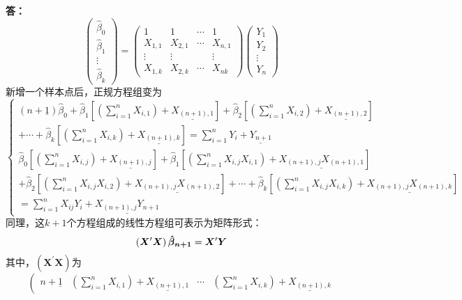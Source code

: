 \documentclass[12pt, a4paper, oneside]{article}
\newcounter{answername}
\newenvironment{answer}{\stepcounter{answername}\par\noindent\textbf{答：}\newline}{\\\par}
\begin{document}
\begin{CJK*}{UTF8}{gbsn}
\begin{answer}
$$\left(\begin{array}{c}
	\hat{\beta}_{0}
	\\
	\hat{\beta}_{1}
	\\
	\vdots
	\\
	\hat{\beta}_{k}
\end{array}\right)
=
\left(\begin{array}{cccc}
	1 & 1 & \cdots & 1
	\\
	X_{1, 1} & X_{2, 1} & \cdots & X_{n, 1}
	\\
	\vdots & \vdots & & \vdots
	\\
	X_{1, k} & X_{2, k} & \cdots & X_{n k}
\end{array}\right)
\left(\begin{array}{c}
	Y_{1}\\ Y_{2} \\ \vdots \\ Y_{n}
\end{array}\right)
$$
新增一个样本点后，正规方程组变为
$$
	\left\{\begin{array}{l}
	 (n+\underline{1})\hat{\beta}_{0}
	+\hat{\beta}_{1} \left[ (\sum_{i=1}^n{X_{i, 1}}) + \underline{X_{(n+1), 1}} \right]
	+\hat{\beta}_{2} \left[ (\sum_{i=1}^n{X_{i, 2}}) + \underline{X_{(n+1), 2}} \right]
	\\+\cdots
	+\hat{\beta}_{k} \left[ (\sum_{i=1}^n{X_{i, k}}) + \underline{X_{(n+1), k}} \right]
	=\sum_{i=1}^n{Y_{i}}
	+\underline{Y_{n+1}}
	\\
	 \hat{\beta}_{0} \left[ (\sum_{i=1}^n{X_{i, j}}) + \underline{X_{(n+1), j}} \right]
	+\hat{\beta}_{1} \left[ (\sum_{i=1}^n{X_{i, j} X_{i, 1}}) + \underline{X_{(n+1), j} X_{(n+1), 1}} \right]
	\\+\hat{\beta}_{2} \left[ (\sum_{i=1}^n{X_{i, j} X_{i, 2}}) + \underline{X_{(n+1), j} X_{(n+1), 2}} \right]
	+\cdots
	+\hat{\beta}_{k} \left[ (\sum_{i=1}^n{X_{i, j} X_{i, k}}) + \underline{X_{(n+1), j} X_{(n+1), k}}  \right]
	\\=\sum_{i=1}^n{X_{ij}Y_{i}} + \underline{X_{(n+1),j} Y_{n+1}}
	\end{array}\right.
$$
同理，这$k+1$个方程组成的线性方程组可表示为矩阵形式：
	\vspace{-0.5cm}
	$$
	\vspace{-0.5cm}
	\left(\boldsymbol{X}^{\prime} \boldsymbol{X}\right) \boldsymbol{\hat{\beta}_{n+1}}=\boldsymbol{X}^{\prime} \boldsymbol{Y}
	$$
其中，$\left(\boldsymbol{X}^{\prime} \boldsymbol{X}\right)$为
$$
\left(\begin{array}{cccc}
	n+\underline{1} & (\sum_{i=1}^n{X_{i, 1}}) + \underline{X_{(n+1), 1}} & \cdots & (\sum_{i=1}^n{X_{i, k}}) + \underline{X_{(n+1), k}} 

\end{array}$$
\end{answer}
\end{CJK*}
\end{document}
